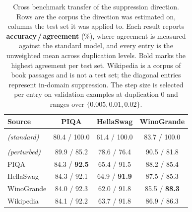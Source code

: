\begin{table}[h]
    \centering
    \small
    \setlength{\tabcolsep}{5pt}
    \renewcommand{\arraystretch}{1.12}
    \caption{
        Cross benchmark transfer of the suppression direction. Rows are the corpus the direction was
        estimated on, columns the test set it was applied to. Each result reports
        \textbf{accuracy\,/\,agreement} (\%), where agreement is measured against the standard model,
        and every entry is the unweighted mean across duplication levels. Bold marks the highest agreement per test set. Wikipedia is a corpus of book passages and is not a test set; the diagonal
        entries represent in-domain suppression. The step size is selected per entry on validation examples at
        duplication $0$ and ranges over $\{0.005, 0.01, 0.02\}$.
    }
    \begin{tabular}{@{}l c c c@{}}
        \toprule
        \textbf{Source}
        & \textbf{PIQA}
        & \textbf{HellaSwag}
        & \textbf{WinoGrande} \\
        \midrule

        \shortstack[l]{\textbf{Target}\\\textit{(standard)}}
        & 80.4 / 100.0
        & 61.4 / 100.0
        & 83.7 / 100.0 \\

        \rowcolor{gray!18}
        \shortstack[l]{\textbf{No edit}\\\textit{(perturbed)}}
        & 89.9 / 85.2
        & 78.6 / 76.4
        & 90.5 / 81.8 \\

        \midrule

        PIQA
        & 84.3 / \textbf{92.5}
        & 65.4 / 91.5
        & 88.2 / 85.4 \\

        HellaSwag
        & 84.3 / 92.1
        & 64.9 / \textbf{91.9}
        & 87.5 / 85.3 \\

        WinoGrande
        & 84.0 / 92.3
        & 62.0 / 91.8
        & 85.5 / \textbf{88.3} \\

        Wikipedia
        & 84.1 / 92.2
        & 63.7 / 91.8
        & 86.9 / 86.3 \\

        \bottomrule
    \end{tabular}
    \label{tab:cross-benchmark-transfer}
\end{table}
